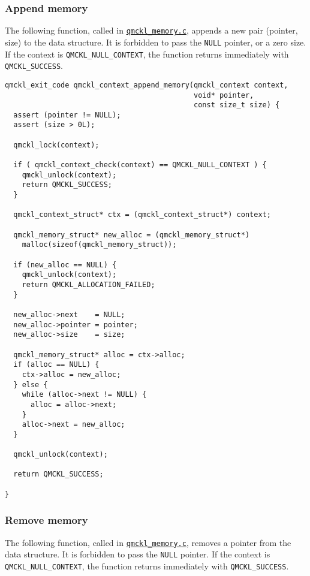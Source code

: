 \subsubsection{Append memory}
\label{sec:orgbdc2712}

The following function, called in \href{./qmckl\_memory.html}{\texttt{qmckl\_memory.c}}, appends a new
pair (pointer, size) to the data structure.
It is forbidden to pass the \texttt{NULL} pointer, or a zero size.
If the context is \texttt{QMCKL\_NULL\_CONTEXT}, the function returns
immediately with \texttt{QMCKL\_SUCCESS}.

\begin{verbatim}
qmckl_exit_code qmckl_context_append_memory(qmckl_context context,
                                            void* pointer,
                                            const size_t size) {
  assert (pointer != NULL);
  assert (size > 0L);

  qmckl_lock(context);

  if ( qmckl_context_check(context) == QMCKL_NULL_CONTEXT ) {
    qmckl_unlock(context);
    return QMCKL_SUCCESS;
  }

  qmckl_context_struct* ctx = (qmckl_context_struct*) context; 

  qmckl_memory_struct* new_alloc = (qmckl_memory_struct*)
    malloc(sizeof(qmckl_memory_struct));

  if (new_alloc == NULL) {
    qmckl_unlock(context);
    return QMCKL_ALLOCATION_FAILED;
  }
  
  new_alloc->next    = NULL;
  new_alloc->pointer = pointer;
  new_alloc->size    = size;

  qmckl_memory_struct* alloc = ctx->alloc;
  if (alloc == NULL) {
    ctx->alloc = new_alloc;
  } else {
    while (alloc->next != NULL) {
      alloc = alloc->next;
    }
    alloc->next = new_alloc;
  }
    
  qmckl_unlock(context);

  return QMCKL_SUCCESS;

}
\end{verbatim}

\subsubsection{Remove memory}
\label{sec:org3fef27a}

The following function, called in \href{./qmckl\_memory.html}{\texttt{qmckl\_memory.c}}, removes a 
pointer from the data structure.
It is forbidden to pass the \texttt{NULL} pointer.
If the context is \texttt{QMCKL\_NULL\_CONTEXT}, the function returns
immediately with \texttt{QMCKL\_SUCCESS}.

